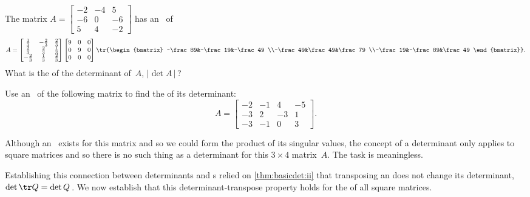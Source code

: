 \begin{activity}
The matrix
\(A=\begin{bmatrix} -2&-4&5
\\-6&0&-6
\\5&4&-2 \end{bmatrix}\)
has an \svd\ of
\begin{equation*}
A=\begin{bmatrix} \frac13&-\frac23&\frac23
\\\frac23&\frac23&\frac13
\\-\frac23&\frac13&\frac23 \end{bmatrix}
\begin{bmatrix} 9&0&0\\0&9&0\\0&0&0 \end{bmatrix}
\tr{\begin{bmatrix} -\frac89&-\frac19&-\frac49
\\-\frac49&\frac49&\frac79
\\-\frac19&-\frac89&\frac49 \end{bmatrix}}.
\end{equation*}
What is the  of the determinant of~\(A\), \(|\det A\,|\)\,?
\end{activity}




\begin{example} 
Use an \svd\ of the following matrix to find the  of its determinant:
\begin{equation*}
A=\begin{bmatrix}-2&-1&4&-5
\\-3&2&-3&1
\\-3&-1&0&3
\end{bmatrix}.
\end{equation*}
\begin{solution} 
Although an \svd\ exists for this matrix and so we could form the product of its singular values, the concept of a determinant only applies to square matrices and so there is no such thing as a determinant for this \(3\times4\) matrix~\(A\).
The task is meaningless.
\end{solution}
\end{example}




Establishing this connection between determinants and s relied on \autoref{thm:basicdet:ii} that transposing an  does not change its determinant, \(\det\tr Q=\det Q\)\,.
We now establish that this determinant-transpose property holds for the  of all square matrices.



